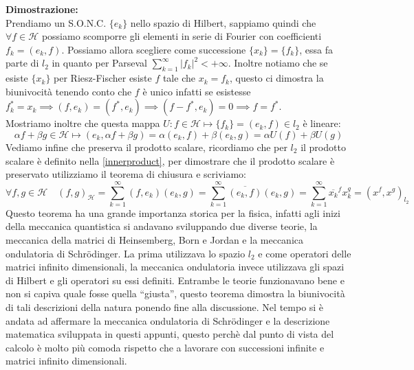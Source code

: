 \documentclass[12pt]{book}
\theoremstyle{plain}
\renewcommand{\H}{\mathcal{H}}
\theoremstyle{definition}
\theoremstyle{remark}
\begin{document}
\hspace{-1.6em}\textbf{Dimostrazione:}\\
Prendiamo un S.O.N.C. $\{e_k\}$ nello spazio di Hilbert, sappiamo quindi che $\forall f\in \H$ possiamo scomporre gli elementi in serie di Fourier con coefficienti $f_k =(e_k,f)$. Possiamo allora scegliere come successione $\{x_k\}=\{f_k\}$, essa fa parte di $l_2$ in quanto per Parseval $\displaystyle\sum_{k=1}^\infty|f_k|^2<+\infty$. Inoltre notiamo che se esiste $\{x_k\}$ per Riesz-Fischer esiste $f$ tale che $x_k = f_k$, questo ci dimostra la biunivocità tenendo conto che $f$ è unico infatti se esistesse $f^*_k = x_k\implies (f,e_k)=(f^*,e_k)\implies (f-f^*,e_k)=0\implies f=f^*$.\\
Mostriamo inoltre che questa mappa $U:f\in\H\mapsto \{f_k\}=(e_k,f)\in l_2$ è lineare:
\[\alpha f+\beta g\in\H \mapsto (e_k,\alpha f+\beta g) = \alpha(e_k,f)+\beta(e_k,g) = \alpha U(f)+\beta U(g) \]
Vediamo infine che preserva il prodotto scalare, ricordiamo che per $l_2$ il prodotto scalare è definito nella \eqref{innerproduct}, per dimostrare che il prodotto scalare è preservato utilizziamo il teorema di chiusura e scriviamo:
\[\forall f,g\in\H \quad (f,g)_\H =\sum_{k=1}^\infty (f,e_k)(e_k,g) = \sum_{k=1}^\infty \overline{(e_k,f)}(e_k,g) = \sum_{k=1}^\infty \overline{x_k}^fx_k^g = (x^f,x^g)_{l_2}\]
Questo teorema ha una grande importanza storica per la fisica, infatti agli inizi della meccanica quantistica si andavano sviluppando due diverse teorie, la meccanica della matrici di Heinsemberg, Born e Jordan e la meccanica ondulatoria di Schr{\"o}dinger. La prima utilizzava lo spazio $l_2$ e come operatori delle matrici infinito dimensionali, la meccanica ondulatoria invece utilizzava gli spazi di Hilbert e gli operatori su essi definiti. Entrambe le teorie funzionavano bene e non si capiva quale fosse quella ``giusta'', questo teorema dimostra la biunivocità di tali descrizioni della natura ponendo fine alla discussione. Nel tempo si è andata ad affermare la meccanica ondulatoria di Schr{\"o}dinger e la descrizione matematica sviluppata in questi appunti, questo perchè dal punto di vista del calcolo è molto più comoda rispetto che a lavorare con successioni infinite e matrici infinito dimensionali.
\end{document}
